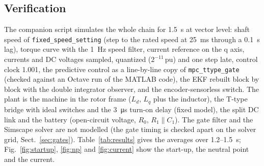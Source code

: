\documentclass[10pt,a4paper]{scrartcl}
\newcommand{\pu}{\,\mathrm{pu}}
\newcommand{\code}[1]{\texttt{#1}}
\begin{document}
\begin{onehalfspace}
\section{Verification}
\label{sec:verification}

The companion script simulates the whole chain for \SI{1.5}{s} at vector level: shaft speed of \code{fixed\_speed\_setting} (step to the rated speed at \SI{25}{ms} through a \SI{0.1}{s} lag), torque curve with the \SI{1}{Hz} speed filter, current reference on the q axis, currents and DC voltages sampled, quantized ($2^{-11}\pu$) and one step late, control clock 1.001, the predictive control as a line-by-line copy of \code{mpc\_ttype\_gate} (checked against an Octave run of the MATLAB code), the EKF rebuilt block by block with the double integrator observer, and the encoder-sensorless switch. The plant is the machine in the rotor frame ($L_d$, $L_q$ plus the inductor), the T-type bridge with ideal switches and the \SI{3}{\micro s} turn-on delay (fixed model), the split DC link and the battery (open-circuit voltage, $R_0$, $R_1 \parallel C_1$). The gate filter and the Simscape solver are not modelled (the gate timing is checked apart on the solver grid, Sect.~\ref{sec:gates}). Table~\ref{tab:results} gives the averages over 1.2--\SI{1.5}{s}; Fig.~\ref{fig:startup}, \ref{fig:np} and \ref{fig:current} show the start-up, the neutral point and the current.


\end{onehalfspace}
\end{document}
